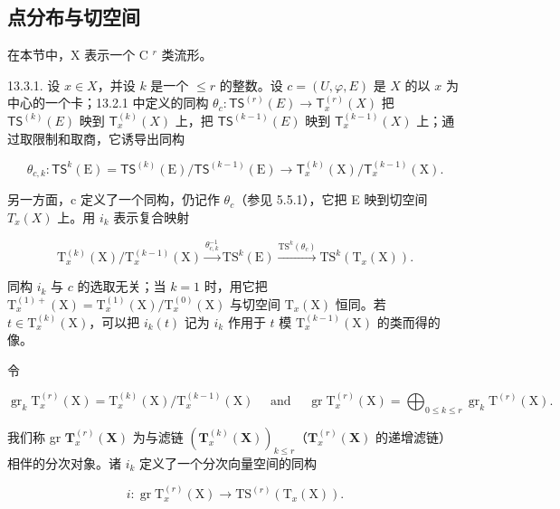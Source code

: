 \subsection{点分布与切空间}

在本节中，X 表示一个 C \(^{r}\) 类流形。

13.3.1. 设 \(x \in X\)，并设 \(k\) 是一个 \(\leqslant r\) 的整数。设 \(c = (U, \varphi, E)\) 是 \(X\) 的以 \(x\) 为中心的一个卡；13.2.1 中定义的同构 \(\theta_c \colon \mathsf{TS}^{(r)}(E) \to \mathsf{T}_x^{(r)}(X)\) 把 \(\mathsf{TS}^{(k)}(E)\) 映到 \(\mathsf{T}_x^{(k)}(X)\) 上，把 \(\mathsf{TS}^{(k-1)}(E)\) 映到 \(\mathsf{T}_x^{(k-1)}(X)\) 上；通过取限制和取商，它诱导出同构

\[
\theta_ {c, k} \colon \mathsf {T S} ^ {k} (\mathrm{E}) = \mathsf {T S} ^ {(k)} (\mathrm{E}) / \mathsf {T S} ^ {(k - 1)} (\mathrm{E}) \rightarrow \mathsf {T} _ {x} ^ {(k)} (\mathrm{X}) / \mathsf {T} _ {x} ^ {(k - 1)} (\mathrm{X}).
\]

另一方面，c 定义了一个同构，仍记作 \(\theta_{c}\)（参见 5.5.1），它把 E 映到切空间 \(T_{x}(X)\) 上。用 \(i_{k}\) 表示复合映射

\[
\mathrm{T} _ {x} ^ {(k)} (\mathrm{X}) / \mathrm{T} _ {x} ^ {(k - 1)} (\mathrm{X}) \xrightarrow {\theta_ {c , k} ^ {- 1}} \mathrm{TS} ^ {k} (\mathrm{E}) \xrightarrow {\mathrm{TS} ^ {k} (\theta_ {c})} \mathrm{TS} ^ {k} (\mathrm{T} _ {x} (\mathrm{X})).
\]

同构 \(i_k\) 与 \(c\) 的选取无关；当 \(k = 1\) 时，用它把 \(\mathrm{T}_x^{(1)+}(\mathrm{X}) = \mathrm{T}_x^{(1)}(\mathrm{X}) / \mathrm{T}_x^{(0)}(\mathrm{X})\) 与切空间 \(\mathrm{T}_x(\mathrm{X})\) 恒同。若 \(t \in \mathrm{T}_x^{(k)}(\mathrm{X})\)，可以把 \(i_k(t)\) 记为 \(i_k\) 作用于 \(t\) 模 \(\mathrm{T}_x^{(k-1)}(\mathrm{X})\) 的类而得的像。

令

\[
\operatorname{gr} _ {k} \mathrm{T} _ {x} ^ {(r)} (\mathrm{X}) = \mathrm{T} _ {x} ^ {(k)} (\mathrm{X}) / \mathrm{T} _ {x} ^ {(k - 1)} (\mathrm{X}) \quad \text { and } \quad \operatorname{gr} \mathrm{T} _ {x} ^ {(r)} (\mathrm{X}) = \bigoplus_ {0 \leqslant k \leqslant r} \operatorname{gr} _ {k} \mathrm{T} ^ {(r)} (\mathrm{X}).
\]

我们称 gr \(\mathbf{T}_{x}^{(r)}(\mathbf{X})\) 为与滤链 \((\mathbf{T}_{x}^{(k)}(\mathbf{X}))_{k\leq r}\)（\(\mathbf{T}_{x}^{(r)}(\mathbf{X})\) 的递增滤链）相伴的分次对象。诸 \(i_k\) 定义了一个分次向量空间的同构

\[
i \colon \operatorname{gr} \mathrm{T} _ {x} ^ {(r)} (\mathrm{X}) \rightarrow \mathrm{TS} ^ {(r)} (\mathrm{T} _ {x} (\mathrm{X})).
\]

